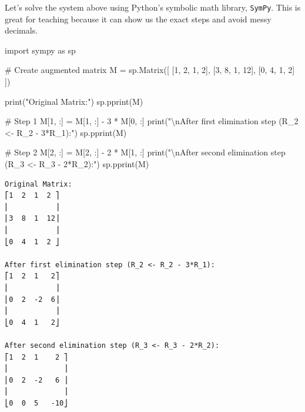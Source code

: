 \documentclass[
  letterpaper,
  DIV=11,
  numbers=noendperiod]{scrreprt}
\newenvironment{Shaded}{\begin{snugshade}}{\end{snugshade}}
\newcommand{\BuiltInTok}[1]{\textcolor[rgb]{0.00,0.23,0.31}{#1}}
\newcommand{\CharTok}[1]{\textcolor[rgb]{0.13,0.47,0.30}{#1}}
\newcommand{\CommentTok}[1]{\textcolor[rgb]{0.37,0.37,0.37}{#1}}
\newcommand{\DecValTok}[1]{\textcolor[rgb]{0.68,0.00,0.00}{#1}}
\newcommand{\ImportTok}[1]{\textcolor[rgb]{0.00,0.46,0.62}{#1}}
\newcommand{\NormalTok}[1]{\textcolor[rgb]{0.00,0.23,0.31}{#1}}
\newcommand{\OperatorTok}[1]{\textcolor[rgb]{0.37,0.37,0.37}{#1}}
\newcommand{\StringTok}[1]{\textcolor[rgb]{0.13,0.47,0.30}{#1}}
\begin{document}
Let's solve the system above using Python's symbolic math library,
\texttt{SymPy}. This is great for teaching because it can show us the
exact steps and avoid messy decimals.

\label{sympy-elimination}
\begin{Shaded}
\begin{Highlighting}[]
\ImportTok{import}\NormalTok{ sympy }\ImportTok{as}\NormalTok{ sp}

\CommentTok{\# Create augmented matrix}
\NormalTok{M }\OperatorTok{=}\NormalTok{ sp.Matrix([}
\NormalTok{  [}\DecValTok{1}\NormalTok{, }\DecValTok{2}\NormalTok{, }\DecValTok{1}\NormalTok{,  }\DecValTok{2}\NormalTok{],}
\NormalTok{  [}\DecValTok{3}\NormalTok{, }\DecValTok{8}\NormalTok{, }\DecValTok{1}\NormalTok{, }\DecValTok{12}\NormalTok{],}
\NormalTok{  [}\DecValTok{0}\NormalTok{, }\DecValTok{4}\NormalTok{, }\DecValTok{1}\NormalTok{,  }\DecValTok{2}\NormalTok{]}
\NormalTok{])}

\BuiltInTok{print}\NormalTok{(}\StringTok{"Original Matrix:"}\NormalTok{)}
\NormalTok{sp.pprint(M)}

\CommentTok{\# Step 1}
\NormalTok{M[}\DecValTok{1}\NormalTok{, :] }\OperatorTok{=}\NormalTok{ M[}\DecValTok{1}\NormalTok{, :] }\OperatorTok{{-}} \DecValTok{3} \OperatorTok{*}\NormalTok{ M[}\DecValTok{0}\NormalTok{, :]}
\BuiltInTok{print}\NormalTok{(}\StringTok{"}\CharTok{\textbackslash{}n}\StringTok{After first elimination step (R\_2 \textless{}{-} R\_2 {-} 3*R\_1):"}\NormalTok{)}
\NormalTok{sp.pprint(M)}

\CommentTok{\# Step 2}
\NormalTok{M[}\DecValTok{2}\NormalTok{, :] }\OperatorTok{=}\NormalTok{ M[}\DecValTok{2}\NormalTok{, :] }\OperatorTok{{-}} \DecValTok{2} \OperatorTok{*}\NormalTok{ M[}\DecValTok{1}\NormalTok{, :]}
\BuiltInTok{print}\NormalTok{(}\StringTok{"}\CharTok{\textbackslash{}n}\StringTok{After second elimination step (R\_3 \textless{}{-} R\_3 {-} 2*R\_2):"}\NormalTok{)}
\NormalTok{sp.pprint(M)}
\end{Highlighting}
\end{Shaded}

\begin{verbatim}
Original Matrix:
⎡1  2  1  2 ⎤
⎢           ⎥
⎢3  8  1  12⎥
⎢           ⎥
⎣0  4  1  2 ⎦

After first elimination step (R_2 <- R_2 - 3*R_1):
⎡1  2  1   2⎤
⎢           ⎥
⎢0  2  -2  6⎥
⎢           ⎥
⎣0  4  1   2⎦

After second elimination step (R_3 <- R_3 - 2*R_2):
⎡1  2  1    2 ⎤
⎢             ⎥
⎢0  2  -2   6 ⎥
⎢             ⎥
⎣0  0  5   -10⎦
\end{verbatim}
\end{document}
